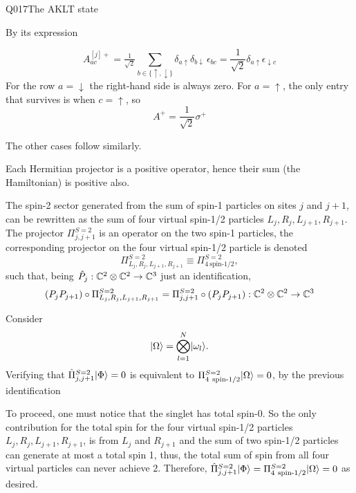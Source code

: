 \begin{entry}{Q017}{The AKLT state}
\begin{solution}[Part (g)]
By its expression

\begin{equation}
    A^{[j]+}_{ac}=\tfrac{1}{\sqrt2}\sum_{b\in\{\uparrow,\downarrow\}}
            \delta_{a\uparrow}\delta_{b \downarrow}\,\epsilon_{bc} = \frac{1}{\sqrt{2}}\delta_{a\uparrow}\epsilon_{\downarrow c}
\end{equation}
For the row $a= \downarrow$ the right-hand side is always zero. For $a=\uparrow$, the only entry that survives is when $c=\uparrow$, so
\begin{equation}
A^{+} = \frac{1}{\sqrt{2}} \sigma^+
\end{equation}

The other cases follow similarly.



\end{solution}




\begin{solution}[Part (h)]
Each Hermitian projector is a positive operator, hence their sum (the Hamiltonian) is positive also.
\end{solution}

\begin{solution}[Part (i)]

The spin-2 sector generated from the sum of spin-1 particles on sites $j$ and $j+1$, can be rewritten as the sum of four virtual spin-1/2 particles $L_j,R_j,L_{j+1},R_{j+1}$. The projector $\Pi^{S=2}_{j,j+1}$ is an operator on the two spin-1 particles, the corresponding projector on the four virtual spin-1/2 particle is denoted $$\Pi^{S=2}_{L_j,R_j,L_{j+1},R_{j+1}} \equiv \Pi^{S=2}_{4\ \text{spin-1/2}},$$ such that, being $\hat P_j: \mathbb{C}^{2}\otimes\mathbb{C}^{2} \to \mathbb{C}^{3}$ just an identification, 
\begin{equation}
   (P_jP_{j+1}) \circ \Pi^{S=2}_{L_j,R_j,L_{j+1},R_{j+1}}  =\Pi^{S=2}_{j,j+1} \circ(P_jP_{j+1}) : \mathbb{C}^{2}\otimes\mathbb{C}^{2} \to \mathbb{C}^{3}  
\end{equation}

Consider 
\begin{equation} 
    \lvert \Omega \rangle= \bigotimes_{l=1}^N\lvert \omega_l \rangle.
\end{equation}
Verifying that $\hat\Pi^{S=2}_{j,j+1}\lvert \Phi \rangle=0$ is equivalent to $\Pi^{S=2}_{4\ \text{spin-1/2}}\ket{\Omega}=0$, by the previous identification

To proceed, one must notice that the singlet has total spin-0. So the only contribution for the total spin for the four virtual spin-1/2 particles $L_j,R_j,L_{j+1},R_{j+1}$, is from $L_j$ and $R_{j+1}$ and the sum of two spin-1/2 particles can generate at most a total spin 1, thus, the total sum of spin from all four virtual particles can never achieve $2$. Therefore, $\hat\Pi^{S=2}_{j,j+1}\ket{\Phi}=\Pi^{S=2}_{4\ \text{spin-1/2}}\ket{\Omega}=0$ as desired.


\end{solution}
\end{entry}
